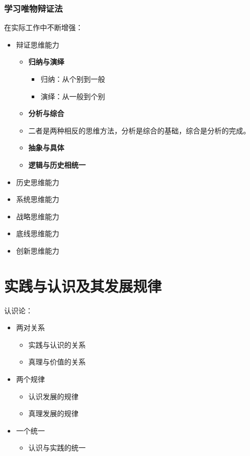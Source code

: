\documentclass[12pt, a4paper, oneside]{ctexart}
\begin{document}
\subsubsection{学习唯物辩证法}

在实际工作中不断增强：
\begin{itemize}
  \item 辩证思维能力
  \begin{itemize}
    \item {\bf 归纳与演绎}
    \begin{itemize}
      \item 归纳：从个别到一般
      \item 演绎：从一般到个别
    \end{itemize}
    \item {\bf 分析与综合}
    \item 二者是两种相反的思维方法，分析是综合的基础，综合是分析的完成。
    \item {\bf 抽象与具体}
    \item {\bf 逻辑与历史相统一}
  \end{itemize}
  \item 历史思维能力
  \item 系统思维能力
  \item 战略思维能力
  \item 底线思维能力
  \item 创新思维能力
\end{itemize}

\section{实践与认识及其发展规律}

认识论：
\begin{itemize}
  \item 两对关系
  \begin{itemize}
    \item 实践与认识的关系
    \item 真理与价值的关系
  \end{itemize}
  \item 两个规律
  \begin{itemize}
    \item 认识发展的规律
    \item 真理发展的规律
  \end{itemize}
  \item 一个统一
  \begin{itemize}
    \item 认识与实践的统一
  \end{itemize}
\end{itemize}
\end{document}
